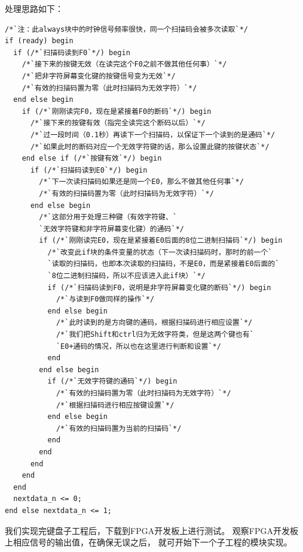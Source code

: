 \documentclass[12pt,a4paper,UTF8]{article}
\begin{document}
处理思路如下：
\begin{lstlisting}[style=verilog-style]
/*`注：此always块中的时钟信号频率很快，同一个扫描码会被多次读取`*/
if (ready) begin
  if (/*`扫描码读到F0`*/) begin
    /*`接下来的按键无效（在读完这个F0之前不做其他任何事）`*/
    /*`把非字符屏幕变化键的按键信号变为无效`*/
    /*`有效的扫描码置为零（此时扫描码为无效字符）`*/
  end else begin
    if (/*`刚刚读完F0，现在是紧接着F0的断码`*/) begin
      /*`接下来的按键有效（指完全读完这个断码以后）`*/
      /*`过一段时间（0.1秒）再读下一个扫描码，以保证下一个读到的是通码`*/
      /*`如果此时的断码对应一个无效字符键的话，那么设置此键的按键状态`*/
    end else if (/*`按键有效`*/) begin
      if (/*`扫描码读到E0`*/) begin
        /*`下一次读扫描码如果还是同一个E0，那么不做其他任何事`*/
        /*`有效的扫描码置为零（此时扫描码为无效字符）`*/
      end else begin
        /*`这部分用于处理三种键（有效字符键、`
        `无效字符键和非字符屏幕变化键）的通码`*/
        if (/*`刚刚读完E0，现在是紧接着E0后面的8位二进制扫描码`*/) begin
          /*`改变此if块的条件变量的状态（下一次读扫描码时，那时的前一个`
          `读取的扫描码，也即本次读取的扫描码，不是E0，而是紧接着E0后面的`
          `8位二进制扫描码，所以不应该进入此if块）`*/
          if (/*`扫描码读到F0，说明是非字符屏幕变化键的断码`*/) begin
            /*`与读到F0做同样的操作`*/
          end else begin
            /*`此时读到的是方向键的通码，根据扫描码进行相应设置`*/
            /*`我们把Shift和ctrl归为无效字符类，但是这两个键也有`
            `E0+通码的情况，所以也在这里进行判断和设置`*/
          end
        end else begin
          if (/*`无效字符键的通码`*/) begin
            /*`有效的扫描码置为零（此时扫描码为无效字符）`*/
            /*`根据扫描码进行相应按键设置`*/
          end else begin
            /*`有效的扫描码置为当前的扫描码`*/
          end
        end
      end
    end
  end
  nextdata_n <= 0; 
end else nextdata_n <= 1;
\end{lstlisting}

我们实现完键盘子工程后，下载到FPGA开发板上进行测试。
观察FPGA开发板上相应信号的输出值，在确保无误之后，
就可开始下一个子工程的模块实现。
\end{document}
